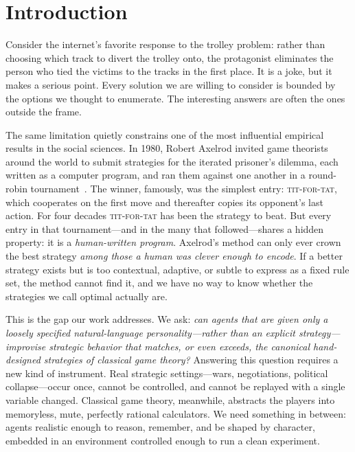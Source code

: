 \section{Introduction}

Consider the internet's favorite response to the trolley problem: rather than choosing which track to divert the trolley onto, the protagonist eliminates the person who tied the victims to the tracks in the first place. It is a joke, but it makes a serious point. Every solution we are willing to consider is bounded by the options we thought to enumerate. The interesting answers are often the ones outside the frame.

The same limitation quietly constrains one of the most influential empirical results in the social sciences. In 1980, Robert Axelrod invited game theorists around the world to submit strategies for the iterated prisoner's dilemma, each written as a computer program, and ran them against one another in a round-robin tournament~\cite{axelrod1984evolution, axelrod1981science}. The winner, famously, was the simplest entry: \textsc{tit-for-tat}, which cooperates on the first move and thereafter copies its opponent's last action. For four decades \textsc{tit-for-tat} has been the strategy to beat. But every entry in that tournament---and in the many that followed---shares a hidden property: it is a \emph{human-written program}. Axelrod's method can only ever crown the best strategy \emph{among those a human was clever enough to encode}. If a better strategy exists but is too contextual, adaptive, or subtle to express as a fixed rule set, the method cannot find it, and we have no way to know whether the strategies we call optimal actually are.

This is the gap our work addresses. We ask: \emph{can agents that are given only a loosely specified natural-language personality---rather than an explicit strategy---improvise strategic behavior that matches, or even exceeds, the canonical hand-designed strategies of classical game theory?} Answering this question requires a new kind of instrument. Real strategic settings---wars, negotiations, political collapse---occur once, cannot be controlled, and cannot be replayed with a single variable changed. Classical game theory, meanwhile, abstracts the players into memoryless, mute, perfectly rational calculators. We need something in between: agents realistic enough to reason, remember, and be shaped by character, embedded in an environment controlled enough to run a clean experiment.


